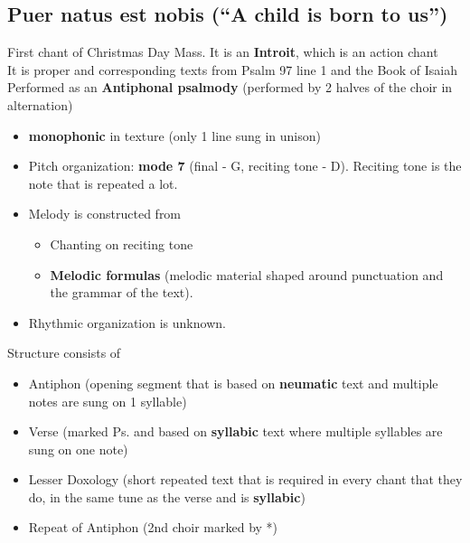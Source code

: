 \documentclass{article}
\begin{document}
  \subsection{Puer natus est nobis (“A child is born to us”)}
  First chant of Christmas Day Mass. It is an \textbf{Introit}, which is an action chant\\
  It is proper and corresponding texts from Psalm 97 line 1 and the Book of Isaiah \\
  Performed as an \textbf{Antiphonal psalmody} (performed by 2 halves of the choir in alternation)
  \begin{itemize}
    \item \textbf{monophonic} in texture (only 1 line sung in unison)
    \item Pitch organization: \textbf{mode 7} (final - G, reciting tone - D). Reciting tone is the note that is repeated a lot.
    \item Melody is constructed from 
      \begin{itemize}
        \item Chanting on reciting tone
        \item \textbf{Melodic formulas} (melodic material shaped around punctuation and the grammar of the text).
      \end{itemize}
    \item Rhythmic organization is unknown.
  \end{itemize}
  Structure consists of
  \begin{itemize}
    \item Antiphon (opening segment that is based on \textbf{neumatic} text and multiple notes are sung on 1 syllable)
    \item Verse (marked Ps. and based on \textbf{syllabic} text where multiple syllables are sung on one note)
    \item Lesser Doxology (short repeated text that is required in every chant that they do, in the same tune as the verse and is \textbf{syllabic})
    \item Repeat of Antiphon (2nd choir marked by *)
  \end{itemize}
\end{document}
